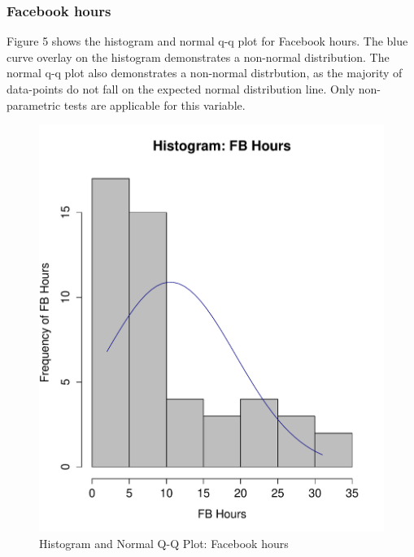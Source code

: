 \subsubsection{Facebook hours}

Figure 5 shows the histogram and normal q-q plot for Facebook hours. The blue curve overlay on the histogram demonstrates a non-normal distribution. The normal q-q plot also demonstrates a non-normal distrbution, as the majority of data-points do not fall on the expected normal distribution line. Only non-parametric tests are applicable for this variable.

\begin{figure}[H]
\caption{Histogram and Normal Q-Q Plot: Facebook hours}
\centering
\includegraphics[scale=0.35]{./img/hist_fbhours.pdf}

\end{figure}
